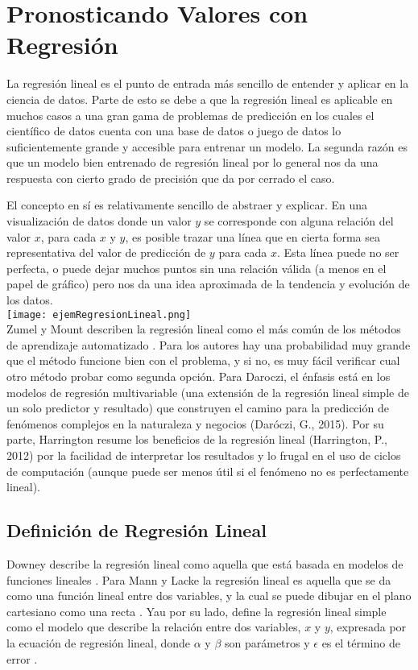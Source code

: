 \section{Pronosticando Valores con Regresión}
La regresión lineal es el punto de entrada más sencillo de entender y aplicar en la ciencia de datos. Parte de esto se debe a que la regresión lineal es aplicable en muchos casos a una gran gama de problemas de predicción en los cuales el científico de datos cuenta con una base de datos o juego de datos lo suficientemente grande y accesible para entrenar un modelo. La segunda razón es que un modelo bien entrenado de regresión lineal por lo general nos da una respuesta con cierto grado de precisión que da por cerrado el caso. 

El concepto en sí es relativamente sencillo de abstraer y explicar. En una visualización de datos donde un valor $y$ se corresponde con alguna relación del valor $x$, para cada $x$ y $y$, es posible trazar una línea que en cierta forma sea representativa del valor de predicción de $y$ para cada $x$. Esta línea puede no ser perfecta, o puede dejar muchos puntos sin una relación válida (a menos en el papel de gráfico) pero nos da una idea aproximada de la tendencia y evolución de los datos. \\

\texttt{[image: ejemRegresionLineal.png]}\\

Zumel y Mount describen la regresión lineal como el más común de los métodos de aprendizaje automatizado \cite{zumelMount}. Para los autores hay una probabilidad muy grande que el método funcione bien con el problema, y si no, es muy fácil verificar cual otro método probar como segunda opción. Para Daroczi, el énfasis está en los modelos de regresión multivariable (una extensión de la regresión lineal simple de un solo predictor y resultado) que construyen el camino para la predicción de fenómenos complejos en la naturaleza y negocios (Daróczi, G., 2015). Por su parte, Harrington resume los beneficios de la regresión lineal (Harrington, P., 2012) por la facilidad de interpretar los resultados y lo frugal en el uso de ciclos de computación (aunque puede ser menos útil si el fenómeno no es perfectamente lineal).

\subsection{Definición de Regresión Lineal}
Downey describe la regresión lineal como aquella que está basada en modelos de funciones lineales \cite{thinkStats}. Para Mann y Lacke la regresión lineal es aquella que se da como una función lineal entre dos variables, y la cual se puede dibujar en el plano cartesiano como una recta \cite{intoStats7}. Yau por su lado, define la regresión lineal simple como el modelo que describe la relación entre dos variables, $x$ y $y$, expresada por la ecuación de regresión lineal, donde $\alpha$ y $\beta$ son parámetros y $\epsilon$ es el término de error \cite{yau}.


